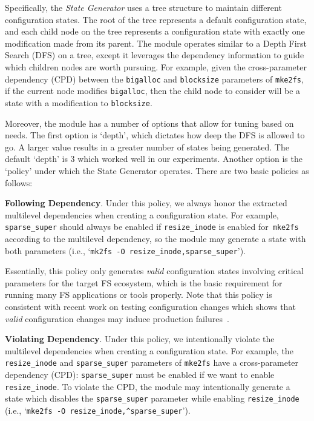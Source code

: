 Specifically, the \textit{State Generator}  uses a tree structure to maintain different configuration states. The root of the tree represents a default configuration state, and each child node on the tree represents a configuration state with exactly one modification made from its parent.
The module operates similar to a Depth First Search (DFS) on a tree, except it leverages the dependency information to guide which children nodes are worth pursuing. For example, given the cross-parameter dependency (CPD) between the \texttt{bigalloc} and \texttt{blocksize} parameters of \texttt{mke2fs}, if the current node modifies  \texttt{bigalloc}, then the child node to consider will be a state with a modification to \texttt{blocksize}.

Moreover, the module has a number of options that allow for tuning based on  needs. The first option is `depth',  which dictates how deep the DFS is allowed to go.  A larger value results in a greater number of  states being generated. The default `depth' is 3 which worked well in our experiments. 
Another option is the `policy' under which the State Generator operates. There are two basic policies as follows:

\smallskip
\noindent
   \textbf{Following Dependency}. Under this policy, we always honor the extracted multilevel dependencies when creating a configuration state. For example, \texttt{sparse\_super} should always be enabled if \texttt{resize\_inode} is enabled for~\texttt{mke2fs} according to the multilevel dependency, so the module may generate a   state with both parameters (i.e., `\texttt{mk2fs -O resize\_inode,sparse\_super}').
 
Essentially, this policy only generates  \textit{valid} configuration states involving critical  parameters for the target FS ecosystem, which is  the basic requirement for running many FS applications or tools properly.
Note that this policy is consistent with recent work on testing configuration changes which shows that \textit{valid} configuration changes may induce production failures~\cite{ctest-OSDI20}. 


\smallskip
\noindent
   \textbf{Violating Dependency}. Under this policy, we intentionally violate   the multilevel dependencies when creating a configuration state. For example,
   the \texttt{resize\_inode}  and  \texttt{sparse\_super} parameters of \texttt{mke2fs} have  a cross-parameter dependency (CPD):  \texttt{sparse\_super} must be enabled if we want to enable \texttt{resize\_inode}. To violate the CPD, the module may intentionally generate a state which disables the \texttt{sparse\_super} parameter while enabling \texttt{resize\_inode} (i.e., `\texttt{mke2fs -O resize\_inode,\^{}sparse\_super}').
   
